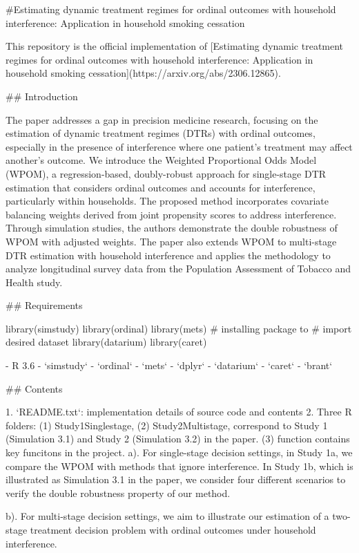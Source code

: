 #Estimating dynamic treatment regimes for ordinal outcomes with household
interference: Application in household smoking cessation


This repository is the official implementation of [Estimating dynamic treatment regimes for ordinal outcomes with household
interference: Application in household smoking cessation](https://arxiv.org/abs/2306.12865).

## Introduction

The paper addresses a gap in precision medicine research, focusing on the estimation of dynamic treatment regimes (DTRs) with ordinal outcomes, especially in the presence of interference where one patient's treatment may affect another's outcome. We introduce the Weighted Proportional Odds Model (WPOM), a regression-based, doubly-robust approach for single-stage DTR estimation that considers ordinal outcomes and accounts for interference, particularly within households. The proposed method incorporates covariate balancing weights derived from joint propensity scores to address interference. Through simulation studies, the authors demonstrate the double robustness of WPOM with adjusted weights. The paper also extends WPOM to multi-stage DTR estimation with household interference and applies the methodology to analyze longitudinal survey data from the Population Assessment of Tobacco and Health study.

## Requirements

library(simstudy)
library(ordinal)
library(mets)
# installing package to
# import desired dataset
library(datarium)
library(caret)


 - R 3.6
 - `simstudy`
 - `ordinal`
 - `mets`
 - `dplyr`
 - `datarium`
 - `caret`
 - `brant`
 
## Contents

  1. `README.txt`: implementation details of source code and contents 
  2. Three R folders: (1) Study1Singlestage, (2) Study2Multistage, correspond to Study 1 (Simulation 3.1) and Study 2 (Simulation 3.2) in the paper. (3) function contains  key funcitons in the project. 
      a). For single-stage decision settings, in Study 1a, we compare the WPOM with methods that ignore interference. In Study 1b, which is illustrated as Simulation 3.1 in the paper, we consider four different scenarios to verify the double robustness property of our method.

      b). For multi-stage decision settings, we aim to illustrate our estimation of a two-stage treatment decision problem with ordinal outcomes under household interference.      

     
 






